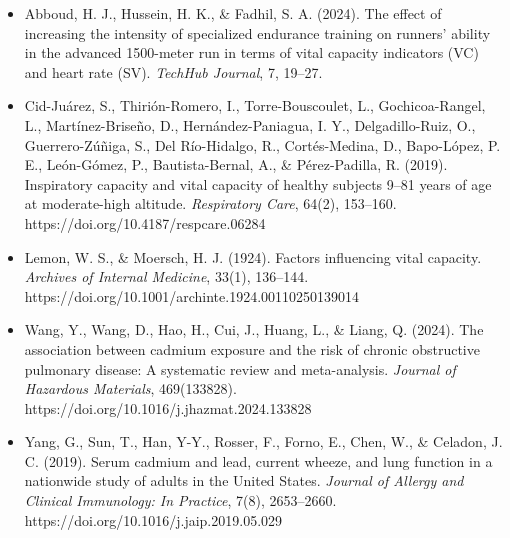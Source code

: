 \documentclass{article}
\begin{document}
		\begin{itemize}
			\item Abboud, H. J., Hussein, H. K., \& Fadhil, S. A. (2024). The effect of increasing the intensity of specialized endurance training on runners' ability in the advanced 1500-meter run in terms of vital capacity indicators (VC) and heart rate (SV). \textit{TechHub Journal}, 7, 19–27.

			\item Cid-Juárez, S., Thirión-Romero, I., Torre-Bouscoulet, L., Gochicoa-Rangel, L., Martínez-Briseño, D., Hernández-Paniagua, I. Y., Delgadillo-Ruiz, O., Guerrero-Zúñiga, S., Del Río-Hidalgo, R., Cortés-Medina, D., Bapo-López, P. E., León-Gómez, P., Bautista-Bernal, A., \& Pérez-Padilla, R. (2019). Inspiratory capacity and vital capacity of healthy subjects 9–81 years of age at moderate-high altitude. \textit{Respiratory Care}, 64(2), 153–160. 
			https://doi.org/10.4187/respcare.06284

			\item Lemon, W. S., \& Moersch, H. J. (1924). Factors influencing vital capacity. \textit{Archives of Internal Medicine}, 33(1), 136–144. 
			https://doi.org/10.1001/archinte.1924.00110250139014 

			\item Wang, Y., Wang, D., Hao, H., Cui, J., Huang, L., \& Liang, Q. (2024). The association between cadmium exposure and the risk of chronic obstructive pulmonary disease: A systematic review and meta-analysis. \textit{Journal of Hazardous Materials}, 469(133828). 
			https://doi.org/10.1016/j.jhazmat.2024.133828 

			\item Yang, G., Sun, T., Han, Y-Y., Rosser, F., Forno, E., Chen, W., \& Celadon, J. C. (2019). Serum cadmium and lead, current wheeze, and lung function in a nationwide study of adults in the United States. \textit{Journal of Allergy and Clinical Immunology: In Practice}, 7(8), 2653–2660. 
			https://doi.org/10.1016/j.jaip.2019.05.029 
		\end{itemize}
\end{document}

